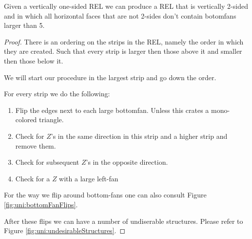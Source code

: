\begin{lemma}
  \label{lm:}
  Given a vertically one-sided REL we can produce a REL that is vertically 2-sided and in which all horizontal faces that are not 2-sides don't contain botomfans larger than 5.
\end{lemma}
\begin{proof}
  There is an ordering on the strips in the REL, namely the order in which they are created. Such that every strip is larger then those above it and smaller then those below it.

  We will start our procedure in the largest strip and go down the order.

  For every strip we do the following:
  \begin{enumerate}
    \item Flip the edges next to each large bottomfan. Unless this crates a mono-colored triangle.
    \item Check for $Z$'s  in the same direction in this strip and a higher strip and remove them.
    \item Check for subsequent $Z$'s in the opposite direction.
    \item Check for a $Z$ with a large left-fan
  \end{enumerate}

  For the way we flip around bottom-fans one can also consult Figure \ref{fig:uni:bottomFanFlips}.

  After these flips we can have a number of undiserable structures. Please refer to Figure \ref{fig:uni:undesirableStructures}.


\end{proof}
